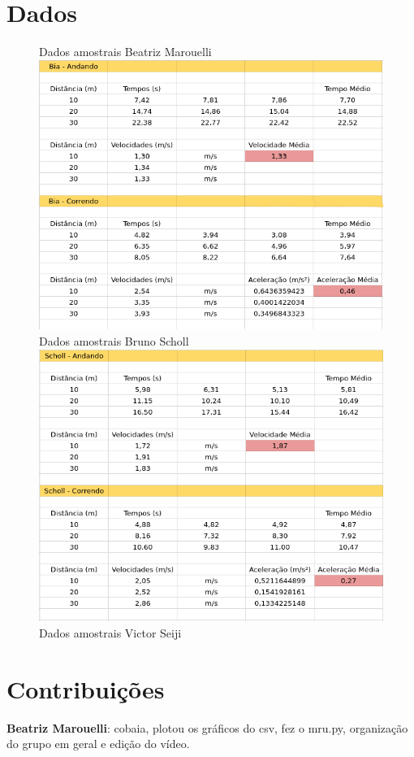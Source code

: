 \documentclass[a4paper, 12pt]{article}
\begin{document}
\section*{Dados}
    \begin{figure}
    \centering
    Dados amostrais Beatriz Marouelli
    \includegraphics[scale=0.45]{Bia.png}
    \\ Dados amostrais Bruno Scholl
    \includegraphics[scale=0.45]{Scholl.png}
    \\ Dados amostrais Victor Seiji 
    \end{figure}
\section*{Contribuições}
\textbf{Beatriz Marouelli}: cobaia, plotou os gráficos do csv, 
fez o mru.py, organização do grupo em geral e edição do vídeo.
\end{document}
